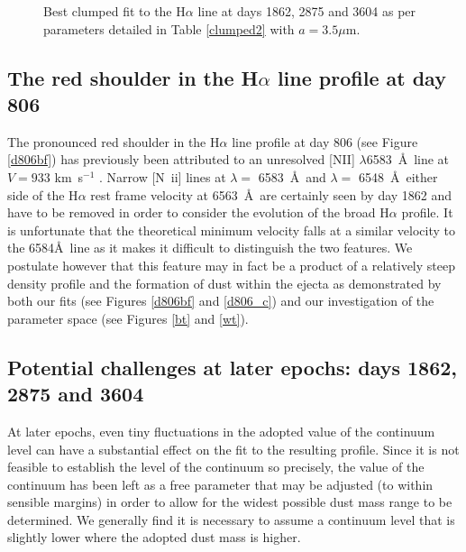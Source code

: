 \documentclass[useAMS,usenatbib,usegraphicx]{mnras}
\begin{document}
\begin{figure}
\begin{center}
\caption{Best clumped fit to the H$\alpha$ line at days 1862, 2875 and 
3604 as per parameters detailed in Table \ref{clumped2} with $a=3.5\mu$m.}
\label{d1862_3604_cmax}
\end{center}
\end{figure}

\subsection{The red shoulder in the H$\alpha$ line profile at day 806}

The pronounced red shoulder in the H$\alpha$ line profile at day 806 (see Figure \ref{d806bf}) has previously been 
attributed to an unresolved [NII] $\lambda$6583~\AA\ line at $V=933$ 
km~s$^{-1}$ \citep{Kozma1997}.  Narrow [N~{\sc ii}] lines at $\lambda=$ 
6583~\AA\ and $\lambda=$ 6548~\AA\ either side of the H$\alpha$ rest frame
 velocity at 6563~\AA\ are certainly seen by day 1862 and have to be 
removed in order to consider the evolution of the broad H$\alpha$ profile. 
It is  unfortunate that the theoretical minimum velocity falls at 
a similar velocity to the 6584\AA\ line as it makes it difficult to distinguish 
the two features.  We postulate however that this feature may in fact be a 
product of a relatively steep density profile and the formation of dust 
within the ejecta as demonstrated by both our fits (see Figures 
\ref{d806bf} and \ref{d806_c}) and our investigation of the parameter 
space (see Figures \ref{bt} and \ref{wt}).



\subsection{Potential challenges at later epochs: days 1862, 2875 and 3604}

At later epochs, even  tiny fluctuations in the adopted value of the 
continuum level can have a substantial effect on the fit to the resulting 
profile.  Since it is not feasible to establish the level of the continuum 
so precisely, the value of the continuum has been left as a free parameter 
that may be adjusted (to within sensible margins) in order to allow for 
the widest possible dust mass range to be determined.  We generally find 
it is necessary to assume a continuum level that is slightly lower where 
the adopted dust mass is higher.
\end{document}
